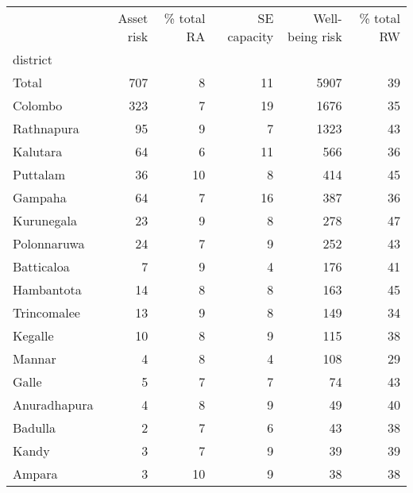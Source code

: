 \begin{tabular}{lrrrrr}
\toprule
{} &  Asset risk &  \% total RA &  SE capacity &  Well-being risk &  \% total RW \\
district     &             &             &              &                  &             \\
\midrule
Total        &         707 &           8 &           11 &             5907 &          39 \\
Colombo      &         323 &           7 &           19 &             1676 &          35 \\
Rathnapura   &          95 &           9 &            7 &             1323 &          43 \\
Kalutara     &          64 &           6 &           11 &              566 &          36 \\
Puttalam     &          36 &          10 &            8 &              414 &          45 \\
Gampaha      &          64 &           7 &           16 &              387 &          36 \\
Kurunegala   &          23 &           9 &            8 &              278 &          47 \\
Polonnaruwa  &          24 &           7 &            9 &              252 &          43 \\
Batticaloa   &           7 &           9 &            4 &              176 &          41 \\
Hambantota   &          14 &           8 &            8 &              163 &          45 \\
Trincomalee  &          13 &           9 &            8 &              149 &          34 \\
Kegalle      &          10 &           8 &            9 &              115 &          38 \\
Mannar       &           4 &           8 &            4 &              108 &          29 \\
Galle        &           5 &           7 &            7 &               74 &          43 \\
Anuradhapura &           4 &           8 &            9 &               49 &          40 \\
Badulla      &           2 &           7 &            6 &               43 &          38 \\
Kandy        &           3 &           7 &            9 &               39 &          39 \\
Ampara       &           3 &          10 &            9 &               38 &          38 \\

\end{tabular}
